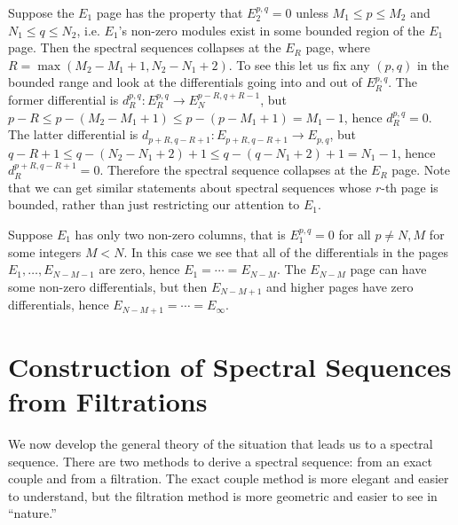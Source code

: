 \begin{example}
Suppose the $E_1$ page has the property that $E_2^{p,q} = 0$ unless $M_1 \leq p \leq M_2$ and $N_1 \leq q \leq N_2$, i.e. $E_1$'s non-zero modules exist in some bounded region of the $E_1$ page. Then the spectral sequences collapses at the $E_R$ page, where \nolinebreak $R=\max(M_2-M_1+1,N_2-N_1+2)$. To see this let us fix any $(p,q)$ in the bounded range and look at the differentials going into and out of $E_R^{p,q}$. The former differential is $d_R^{p,q} : E_R^{p,q} \rightarrow E_N^{p-R,q+R-1}$, but $p-R \leq p-(M_2-M_1+1) \leq p-(p-M_1+1) = M_1-1$, hence $d_R^{p,q} = 0$. The latter differential is $d_{p+R,q-R+1} : E_{p+R,q-R+1} \rightarrow E_{p,q}$, but $q-R+1 \leq q-(N_2-N_1+2)+1 \leq q-(q-N_1+2)+1 = N_1-1$, hence $d_R^{p+R,q-R+1} = 0$. Therefore the spectral sequence collapses at the $E_R$ page. Note that we can get similar statements about spectral sequences whose $r$-th page is bounded, rather than just restricting our attention to $E_1$.
\end{example}

\begin{example}
Suppose $E_1$ has only two non-zero columns, that is $E_1^{p,q} = 0$ for all $p \neq N,M$ for some integers $M<N$. In this case we see that all of the differentials in the pages $E_1,\ldots,E_{N-M-1}$ are zero, hence $E_1 = \cdots = E_{N-M}$. The $E_{N-M}$ page can have some non-zero differentials, but then $E_{N-M+1}$ and higher pages have zero differentials, hence $E_{N-M+1} = \cdots = E_\infty$.
\end{example}



\section{Construction of Spectral Sequences from Filtrations}

We now develop the general theory of the situation that leads us to a spectral sequence. There are two methods to derive a spectral sequence: from an exact couple and from a filtration. The exact couple method is more elegant and easier to understand, but the filtration method is more geometric and easier to see in ``nature.''

